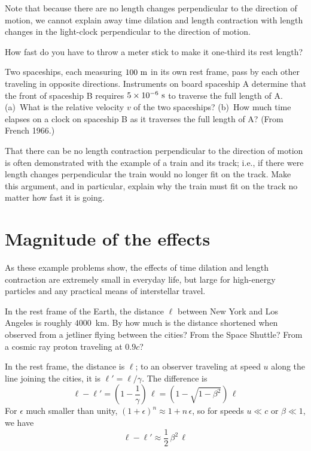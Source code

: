 Note that because there are no length changes perpendicular to the
direction of motion, we cannot explain away time dilation and length
contraction with length changes in the light-clock perpendicular to
the direction of motion.

\begin{problem}
How fast do you have to throw a meter stick to make it one-third its
rest length?
\end{problem}

\begin{problem}
Two spaceships, each measuring $100~{\rm m}$ in its own rest frame,
pass by each other traveling in opposite directions.  Instruments on
board spaceship A determine that the front of spaceship B requires
$5\times10^{-6}~{\rm s}$ to traverse the full length of A.  (a)~What
is the relative velocity $v$ of the two spaceships?  (b)~How much time
elapses on a clock on spaceship B as it traverses the full length of
A?  (From French 1966.)
\end{problem}

\begin{problem}
That there can be no length contraction perpendicular to the direction
of motion is often demonstrated with the example of a train and its
track; i.e., if there were length changes perpendicular the train
would no longer fit on the track.  Make this argument, and in
particular, explain why the train must fit on the track no matter how
fast it is going.
\end{problem}


\section{Magnitude of the effects}
\label{sec:mageff}

As these example problems show, the effects of time dilation and
length contraction are extremely small in everyday life, but large
for high-energy particles and any practical means of interstellar
travel.

\begin{problem}
In the rest frame of the Earth, the distance $\ell$ between New York
and Los Angeles is roughly $4000$~km.  By how much is the distance
shortened when observed from a jetliner flying between the cities?
From the Space Shuttle?  From a cosmic ray proton traveling at $0.9c$?
\end{problem}

In the rest frame, the distance is $\ell$; to an observer traveling at
speed $u$ along the line joining the cities, it is
$\ell'=\ell/\gamma$.  The difference is
\begin{equation}
\ell-\ell' = \left(1-\frac{1}{\gamma}\right)\,\ell
     = \left(1-\sqrt{1-\beta^2}\right)\,\ell
\end{equation}
For $\epsilon$ much smaller than unity, $(1+\epsilon)^n\approx
1+n\,\epsilon$, so for speeds $u\ll c$ or $\beta\ll 1$, we have
\begin{equation}
\ell-\ell'\approx \frac{1}{2}\,\beta^2\,\ell
\end{equation}


